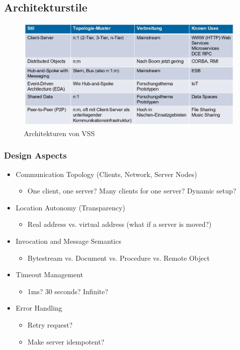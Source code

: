 \subsection{Architekturstile}

\begin{figure}[h]
	\centering
	\includegraphics[width=0.7\linewidth]{img/vss_architecture}
	\caption{Architekturen von VSS}
	\label{fig:vssarchitecture}
\end{figure}

\subsubsection{Design Aspects}
\begin{itemize}
	\item Communication Topology (Clients, Network, Server Nodes)
		\begin{itemize}
			\item One client, one server? Many clients for one server? Dynamic setup?
		\end{itemize}
	\item Location Autonomy (Transparency)
		\begin{itemize}
			\item Real address vs. virtual address (what if a server is moved?)
		\end{itemize}
	\item Invocation and Message Semantics
		\begin{itemize}
			\item Bytestream vs. Document vs. Procedure vs. Remote Object
		\end{itemize}
	\item Timeout Management
		\begin{itemize}
			\item 1ms? 30 seconds? Infinite?
		\end{itemize}
	\item Error Handling
		\begin{itemize}
			\item Retry request? 
			\item Make server idempotent?
		\end{itemize}
\end{itemize}

